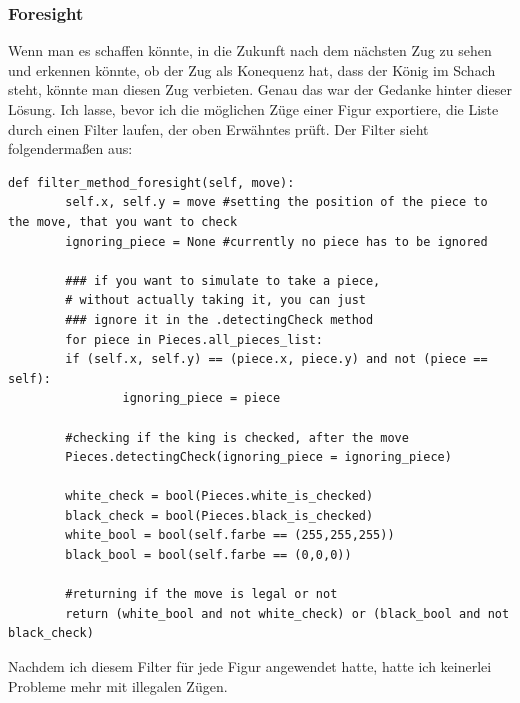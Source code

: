 \documentclass[a4paper, 10pt]{scrartcl}
\begin{document}
\subsubsection{Foresight}
Wenn man es schaffen könnte, in die Zukunft nach dem nächsten Zug zu sehen und erkennen könnte, ob
der Zug als Konequenz hat, dass der König im Schach steht, könnte man diesen Zug verbieten. 
Genau das war der Gedanke hinter dieser Lösung. Ich lasse, bevor ich die möglichen Züge
einer Figur exportiere, die Liste durch einen Filter laufen, der oben Erwähntes prüft.
Der Filter sieht folgendermaßen aus:

\begin{lstlisting}
def filter_method_foresight(self, move):
        self.x, self.y = move #setting the position of the piece to the move, that you want to check
        ignoring_piece = None #currently no piece has to be ignored

        ### if you want to simulate to take a piece, 
        # without actually taking it, you can just 
        ### ignore it in the .detectingCheck method 
        for piece in Pieces.all_pieces_list:
        if (self.x, self.y) == (piece.x, piece.y) and not (piece == self):
                ignoring_piece = piece

        #checking if the king is checked, after the move
        Pieces.detectingCheck(ignoring_piece = ignoring_piece)

        white_check = bool(Pieces.white_is_checked)
        black_check = bool(Pieces.black_is_checked)
        white_bool = bool(self.farbe == (255,255,255))
        black_bool = bool(self.farbe == (0,0,0))

        #returning if the move is legal or not
        return (white_bool and not white_check) or (black_bool and not black_check)
\end{lstlisting}

Nachdem ich diesem Filter für jede Figur angewendet hatte, hatte ich keinerlei Probleme mehr mit
illegalen Zügen. 
\end{document}
